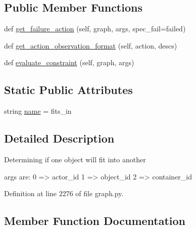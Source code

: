 \subsection*{Public Member Functions}
\begin{DoxyCompactItemize}
\item 
def \hyperlink{classlight__chats_1_1graph_1_1FitsConstraint_a41bb59f13bde75e990d25d86283f3afe}{get\+\_\+failure\+\_\+action} (self, graph, args, spec\+\_\+fail=\textquotesingle{}failed\textquotesingle{})
\item 
def \hyperlink{classlight__chats_1_1graph_1_1FitsConstraint_a1a14b78e6b28a764e7c7833315db2992}{get\+\_\+action\+\_\+observation\+\_\+format} (self, action, descs)
\item 
def \hyperlink{classlight__chats_1_1graph_1_1FitsConstraint_a56a590d425f4c64c228ce3aa03471ffc}{evaluate\+\_\+constraint} (self, graph, args)
\end{DoxyCompactItemize}
\subsection*{Static Public Attributes}
\begin{DoxyCompactItemize}
\item 
string \hyperlink{classlight__chats_1_1graph_1_1FitsConstraint_a46dead4a9aedc70bec6fffed3b83c7d1}{name} = \textquotesingle{}fits\+\_\+in\textquotesingle{}
\end{DoxyCompactItemize}


\subsection{Detailed Description}
\begin{DoxyVerb}Determining if one object will fit into another

args are:
    0 => actor_id
    1 => object_id
    2 => container_id
\end{DoxyVerb}
 

Definition at line 2276 of file graph.\+py.



\subsection{Member Function Documentation}
\mbox{\label{classlight__chats_1_1graph_1_1FitsConstraint_a56a590d425f4c64c228ce3aa03471ffc}} 
